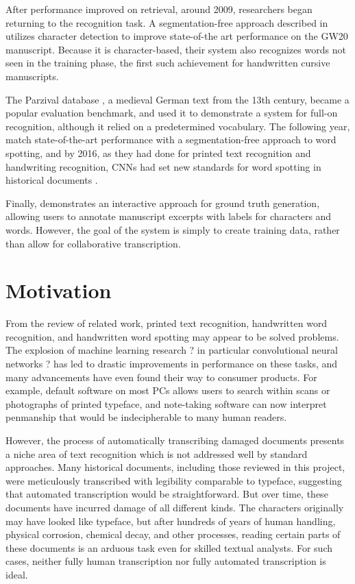 \documentclass[final]{ukthesis}
\begin{document}
After performance improved on retrieval, around 2009, researchers began returning to the recognition task. A segmentation-free approach described in \cite{howe2009finding} utilizes character detection to improve state-of-the art performance on the GW20 manuscript. Because it is character-based, their system also recognizes words not seen in the training phase, the first such achievement for handwritten cursive manuscripts.


The Parzival database \cite{fischer2010ground}, a medieval German text from the 13th century, became a popular evaluation benchmark, and \cite{fischer2014combined} used it to demonstrate a system for full-on recognition, although it relied on a predetermined vocabulary. The following year, \cite{rusinol2015efficient} match state-of-the-art performance with a segmentation-free approach to word spotting, and by 2016, as they had done for printed text recognition and handwriting recognition, CNNs had set new standards for word spotting in historical documents \cite{sudholt2016phocnet,zhong2016spottingnet,krishnan2016deep} .


Finally, \cite{biller2013webgt} demonstrates an interactive approach for ground truth generation, allowing users to annotate manuscript excerpts with labels for characters and words. However, the goal of the system is simply to create training data, rather than allow for collaborative transcription.


%
%
\section{Motivation}
From the review of related work, printed text recognition, handwritten word recognition, and handwritten word spotting may appear to be solved problems. The explosion of machine learning research ? in particular convolutional neural networks ? has led to drastic improvements in performance on these tasks, and many advancements have even found their way to consumer products. For example, default software on most PCs allows users to search within scans or photographs of printed typeface, and note-taking software can now interpret penmanship that would be indecipherable to many human readers.

However, the process of automatically transcribing damaged documents presents a niche area of text recognition which is not addressed well by standard approaches. Many historical documents, including those reviewed in this project, were meticulously transcribed with legibility comparable to typeface, suggesting that automated transcription would be straightforward. But over time, these documents have incurred damage of all different kinds. The characters originally may have looked like typeface, but after hundreds of years of human handling, physical corrosion, chemical decay, and other processes, reading certain parts of these documents is an arduous task even for skilled textual analysts. For such cases, neither fully human transcription nor fully automated transcription is ideal.
\end{document}
